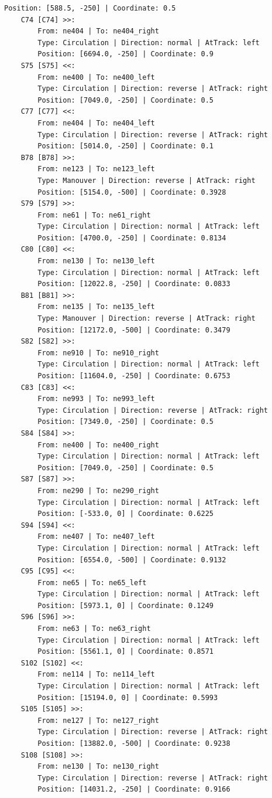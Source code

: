 \begin{lstlisting}[language = {}, tabsize=4, basicstyle=\footnotesize\ttfamily, showspaces=false, showstringspaces=false, caption = Signalling.RNA, label = {lst:EJ4_6}]
		Position: [588.5, -250] | Coordinate: 0.5
	C74 [C74] >>:
		From: ne404 | To: ne404_right
		Type: Circulation | Direction: normal | AtTrack: left 
		Position: [6694.0, -250] | Coordinate: 0.9
	S75 [S75] <<:
		From: ne400 | To: ne400_left
		Type: Circulation | Direction: reverse | AtTrack: right 
		Position: [7049.0, -250] | Coordinate: 0.5
	C77 [C77] <<:
		From: ne404 | To: ne404_left
		Type: Circulation | Direction: reverse | AtTrack: right 
		Position: [5014.0, -250] | Coordinate: 0.1
	B78 [B78] >>:
		From: ne123 | To: ne123_left
		Type: Manouver | Direction: reverse | AtTrack: right 
		Position: [5154.0, -500] | Coordinate: 0.3928
	S79 [S79] >>:
		From: ne61 | To: ne61_right
		Type: Circulation | Direction: normal | AtTrack: left 
		Position: [4700.0, -250] | Coordinate: 0.8134
	C80 [C80] <<:
		From: ne130 | To: ne130_left
		Type: Circulation | Direction: normal | AtTrack: left 
		Position: [12022.8, -250] | Coordinate: 0.0833
	B81 [B81] >>:
		From: ne135 | To: ne135_left
		Type: Manouver | Direction: reverse | AtTrack: right 
		Position: [12172.0, -500] | Coordinate: 0.3479
	S82 [S82] >>:
		From: ne910 | To: ne910_right
		Type: Circulation | Direction: normal | AtTrack: left 
		Position: [11604.0, -250] | Coordinate: 0.6753
	C83 [C83] <<:
		From: ne993 | To: ne993_left
		Type: Circulation | Direction: reverse | AtTrack: right 
		Position: [7349.0, -250] | Coordinate: 0.5
	S84 [S84] >>:
		From: ne400 | To: ne400_right
		Type: Circulation | Direction: normal | AtTrack: left 
		Position: [7049.0, -250] | Coordinate: 0.5
	S87 [S87] >>:
		From: ne290 | To: ne290_right
		Type: Circulation | Direction: normal | AtTrack: left 
		Position: [-533.0, 0] | Coordinate: 0.6225
	S94 [S94] <<:
		From: ne407 | To: ne407_left
		Type: Circulation | Direction: normal | AtTrack: left 
		Position: [6554.0, -500] | Coordinate: 0.9132
	C95 [C95] <<:
		From: ne65 | To: ne65_left
		Type: Circulation | Direction: normal | AtTrack: left 
		Position: [5973.1, 0] | Coordinate: 0.1249
	S96 [S96] >>:
		From: ne63 | To: ne63_right
		Type: Circulation | Direction: normal | AtTrack: left 
		Position: [5561.1, 0] | Coordinate: 0.8571
	S102 [S102] <<:
		From: ne114 | To: ne114_left
		Type: Circulation | Direction: normal | AtTrack: left 
		Position: [15194.0, 0] | Coordinate: 0.5993
	S105 [S105] >>:
		From: ne127 | To: ne127_right
		Type: Circulation | Direction: reverse | AtTrack: right 
		Position: [13882.0, -500] | Coordinate: 0.9238
	S108 [S108] >>:
		From: ne130 | To: ne130_right
		Type: Circulation | Direction: reverse | AtTrack: right 
		Position: [14031.2, -250] | Coordinate: 0.9166

\end{lstlisting}
